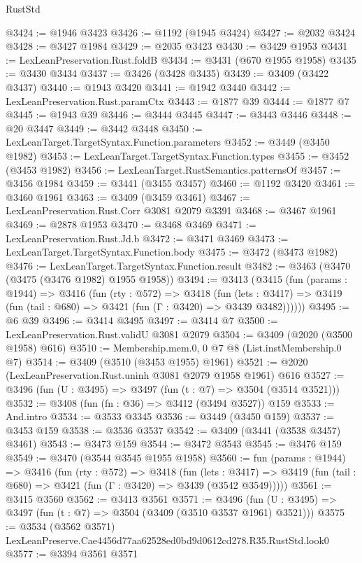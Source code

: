 \begin{lexlean}{RustStd}
\begin{coremodule}
@3424 := @1946 @3423
@3426 := @1192 (@1945 @3424)
@3427 := @2032 @3424
@3428 := @3427 @1984
@3429 := @2035 @3423
@3430 := @3429 @1953
@3431 := LexLeanPreservation.Rust.foldB
@3434 := @3431 (@670 @1955 @1958)
@3435 := @3430 @3434
@3437 := @3426 (@3428 @3435)
@3439 := @3409 (@3422 @3437)
@3440 := @1943 @3420
@3441 := @1942 @3440
@3442 := LexLeanPreservation.Rust.paramCtx
@3443 := @1877 @39
@3444 := @1877 @7
@3445 := @1943 @39
@3446 := @3444 @3445
@3447 := @3443 @3446
@3448 := @20 @3447
@3449 := @3442 @3448
@3450 := LexLeanTarget.TargetSyntax.Function.parameters
@3452 := @3449 (@3450 @1982)
@3453 := LexLeanTarget.TargetSyntax.Function.types
@3455 := @3452 (@3453 @1982)
@3456 := LexLeanTarget.RustSemantics.patternsOf
@3457 := @3456 @1984
@3459 := @3441 (@3455 @3457)
@3460 := @1192 @3420
@3461 := @3460 @1961
@3463 := @3409 (@3459 @3461)
@3467 := LexLeanPreservation.Rust.Corr @3081 @2079 @3391
@3468 := @3467 @1961
@3469 := @2878 @1953
@3470 := @3468 @3469
@3471 := LexLeanPreservation.Rust.Jd.b
@3472 := @3471 @3469
@3473 := LexLeanTarget.TargetSyntax.Function.body
@3475 := @3472 (@3473 @1982)
@3476 := LexLeanTarget.TargetSyntax.Function.result
@3482 := @3463 (@3470 (@3475 (@3476 @1982) @1955 @1958))
@3494 := @3413
    (@3415
      (fun (params : @1944) =>
      @3416
        (fun (rty : @572) =>
        @3418
          (fun (lets : @3417) =>
          @3419 (fun (tail : @680) => @3421 (fun (Γ : @3420) => @3439 @3482))))))
@3495 := @6 @39
@3496 := @3414 @3495
@3497 := @3414 @7
@3500 := LexLeanPreservation.Rust.validU @3081 @2079
@3504 := @3409 (@2020 (@3500 @1958) @616)
@3510 := Membership.mem.{0, 0} @7 @8 (List.instMembership.{0} @7)
@3514 := @3409 (@3510 (@3453 @1955) @1961)
@3521 := @2020 (LexLeanPreservation.Rust.uninh @3081 @2079 @1958 @1961) @616
@3527 := @3496 (fun (U : @3495) => @3497 (fun (t : @7) => @3504 (@3514 @3521)))
@3532 := @3408 (fun (fn : @36) => @3412 (@3494 @3527)) @159
@3533 := And.intro
@3534 := @3533 @3345
@3536 := @3449 (@3450 @159)
@3537 := @3453 @159
@3538 := @3536 @3537
@3542 := @3409 (@3441 (@3538 @3457) @3461)
@3543 := @3473 @159
@3544 := @3472 @3543
@3545 := @3476 @159
@3549 := @3470 (@3544 @3545 @1955 @1958)
@3560 := fun (params : @1944) =>
  @3416
    (fun (rty : @572) =>
    @3418
      (fun (lets : @3417) =>
      @3419 (fun (tail : @680) => @3421 (fun (Γ : @3420) => @3439 (@3542 @3549)))))
@3561 := @3415 @3560
@3562 := @3413 @3561
@3571 := @3496 (fun (U : @3495) => @3497 (fun (t : @7) => @3504 (@3409 (@3510 @3537 @1961) @3521)))
@3575 := @3534 (@3562 @3571) LexLeanPreserve.Cae4456d77aa62528ed0bd9d0612cd278.R35.RustStd.look0
@3577 := @3394 @3561 @3571

\end{coremodule}
\end{lexlean}
